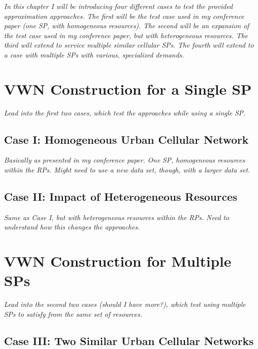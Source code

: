 \documentclass[12pt,dvipsnames]{report}
\begin{document}

\textit{In this chapter I will be introducing four different cases to test the provided approximation approaches.  The first will be the test case used in my conference paper (one SP, with homogeneous resources).  The second will be an expansion of the test case used in my conference paper, but with heterogeneous resources.  The third will extend to service multiple similar cellular SPs.  The fourth will extend to a case with multiple SPs with various, specialized demands.}

\section{VWN Construction for a Single SP} \label{sec:onesp}

\textit{Lead into the first two cases, which test the approaches while using a single SP.}

\subsection{Case I: Homogeneous Urban Cellular Network} \label{subsec:onesp_homres}


\textit{Basically as presented in my conference paper.  One SP, homogeneous resources within the RPs.  Might need to use a new data set, though, with a larger data set.}

\subsection{Case II: Impact of Heterogeneous Resources} \label{subsec:onesp_hetres}

\textit{Same as Case I, but with heterogeneous resources within the RPs.  Need to understand how this changes the approaches.}

\section{VWN Construction for Multiple SPs} \label{sec:mulsp}

\textit{Lead into the second two cases (should I have more?), which test using multiple SPs to satisfy from the same set of resources.}

\subsection{Case III: Two Similar Urban Cellular Networks} \label{subsec:mulsp_sim}
\end{document}
